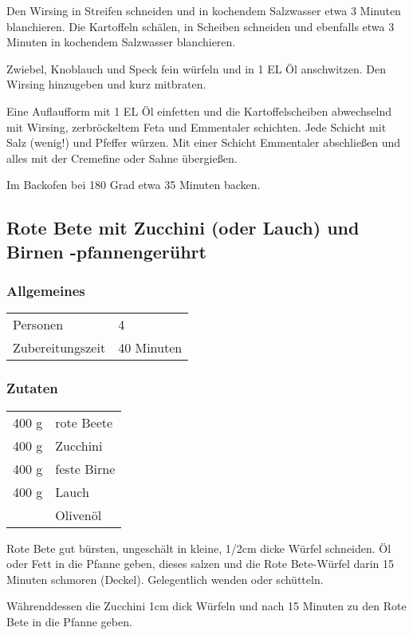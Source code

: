 Den Wirsing in Streifen schneiden und in kochendem Salzwasser etwa 3 Minuten blanchieren. Die Kartoffeln schälen, in Scheiben schneiden und ebenfalls etwa 3 Minuten in kochendem Salzwasser blanchieren.

Zwiebel, Knoblauch und Speck fein würfeln und in 1 EL Öl anschwitzen. Den Wirsing hinzugeben und kurz mitbraten.

Eine Auflaufform mit 1 EL Öl einfetten und die Kartoffelscheiben abwechselnd mit Wirsing, zerbröckeltem Feta und Emmentaler schichten. Jede Schicht mit Salz (wenig!) und Pfeffer würzen. Mit einer Schicht Emmentaler abschließen und alles mit der Cremefine oder Sahne übergießen.

Im Backofen bei 180 Grad etwa 35 Minuten backen.



\subsection{Rote Bete mit Zucchini (oder Lauch) und Birnen -pfannengerührt}\label{sec:RoteBete:pfannengerührt}
\subsubsection*{Allgemeines}
\begin{tabular}{ll}
    Personen         &  4   \\
    Zubereitungszeit &  40 Minuten \\
\end{tabular} 
\subsubsection*{Zutaten}
\begin{tabular}{r l}
    400 g & rote Beete  \\
    400 g & Zucchini    \\
    400 g & feste Birne \\
    400 g & Lauch       \\
          & Olivenöl
\end{tabular}


Rote Bete gut bürsten, ungeschält in kleine, 1/2cm dicke Würfel schneiden. Öl oder Fett in die Pfanne geben, dieses salzen und die Rote Bete-Würfel darin 15 Minuten schmoren (Deckel). Gelegentlich wenden oder schütteln.

Währenddessen die Zucchini 1cm dick Würfeln und nach 15 Minuten zu den Rote Bete in die Pfanne geben.


